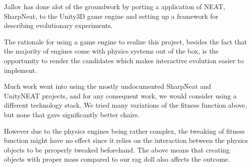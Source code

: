 Jallov has done alot of the groundwork by porting a application of NEAT, 
SharpNeat\cite{web:sharpneat}, to the Unity3D game engine and 
setting up a framework for describing evolutionary 
experiments\cite{web:unityneat}.

The rationale for using  a game engine to realize  this project, besides 
the fact that the majority of engines come with physics systems out of 
the box, is the opportunity to render the candidates which makes interactive 
evolution\cite{Takagi2001} easier to implement.

Much work went into using the mostly undocumented SharpNeat and UnityNEAT
projects, and for any consequent work, we would consider using a different
technology stack.
We tried many variations of the fitness function above, but none that
gave significantly better chairs.

However due to the physics engines being rather complex,  the 
tweaking of fitness function might have no effect since it relies on the 
interaction between the physics objects to be prroperly tweaked 
beforehand.
The above means that creating objects with proper mass compared to our rag doll also affects the outcome.

